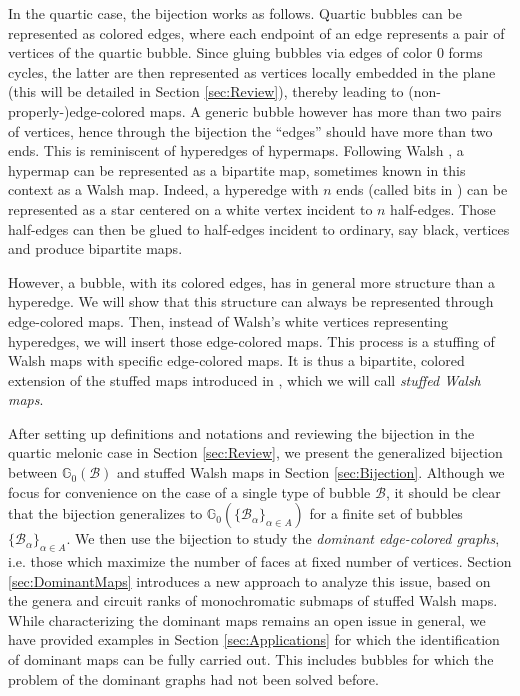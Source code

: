 \documentclass[aps,prd,10pt,notitlepage,nofootinbib,superscriptaddress,showkeys,showpacs]{revtex4-1}
\begin{document}
In the quartic case, the bijection works as follows. Quartic bubbles can be represented as colored edges, where each endpoint of an edge represents a pair of vertices of the quartic bubble. Since gluing bubbles via edges of color 0 forms cycles, the latter are then represented as vertices locally embedded in the plane (this will be detailed in Section \ref{sec:Review}), thereby leading to (non-properly-)edge-colored maps. A generic bubble however has more than two pairs of vertices, hence through the bijection the \enquote{edges} should have more than two ends. This is reminiscent of hyperedges of hypermaps. Following Walsh \cite{Walsh}, a hypermap can be represented as a bipartite map, sometimes known in this context as a Walsh map. Indeed, a hyperedge with $n$ ends (called bits in \cite{Walsh}) can be represented as a star centered on a white vertex incident to $n$ half-edges. Those half-edges can then be glued to half-edges incident to ordinary, say black, vertices and produce bipartite maps.

However, a bubble, with its colored edges, has in general more structure than a hyperedge. We will show that this structure can always be represented through edge-colored maps. Then, instead of Walsh's white vertices representing hyperedges, we will insert those edge-colored maps. This process is a stuffing of Walsh maps with specific edge-colored maps. It is thus a bipartite, colored extension of the stuffed maps introduced in \cite{Stuffed}, which we will call \emph{stuffed Walsh maps}.

After setting up definitions and notations and reviewing the bijection in the quartic melonic case in Section \ref{sec:Review}, we present the generalized bijection between ${\mathbb{G}}_0({\mathcal{B}})$ and stuffed Walsh maps in Section \ref{sec:Bijection}. Although we focus for convenience on the case of a single type of bubble ${\mathcal{B}}$, it should be clear that the bijection generalizes to ${\mathbb{G}}_0(\{{\mathcal{B}}_\alpha\}_{\alpha\in A})$ for a finite set of bubbles $\{{\mathcal{B}}_\alpha\}_{\alpha\in A}$. We then use the bijection to study the \emph{dominant edge-colored graphs}, i.e. those which maximize the number of faces at fixed number of vertices. Section \ref{sec:DominantMaps} introduces a new approach to analyze this issue, based on the genera and circuit ranks of monochromatic submaps of stuffed Walsh maps. While characterizing the dominant maps remains an open issue in general, we have provided examples in Section \ref{sec:Applications} for which the identification of dominant maps can be fully carried out. This includes bubbles for which the problem of the dominant graphs had not been solved before.
\end{document}
